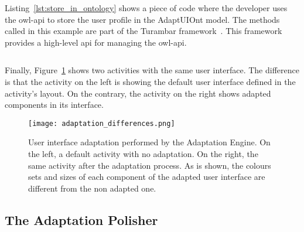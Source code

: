 \inputminted[linenos=true, fontsize=\footnotesize, frame=lines]{java}{4_system_architecture/redraw.java}

\inputminted[linenos=true, fontsize=\footnotesize, frame=lines]{java}{4_system_architecture/abstract_activity.java}

Listing~\ref{lst:store_in_ontology} shows a piece of code where the developer
uses the \ac{owl}-\ac{api} to store the user profile in the AdaptUIOnt model. 
The methods called in this example are part of the Turambar framework~\citep{david_ausin_probabilistic_2014}. 
This framework provides a high-level \ac{api} for managing the \ac{owl}-\ac{api}.

\inputminted[linenos=true, fontsize=\footnotesize, frame=lines]{java}{4_system_architecture/store_in_ontology.java}


Finally, Figure~\ref{fig:adaptation_differences} shows two activities with the
same user interface. The difference is that the activity on the left is showing
the default user interface defined in the activity's layout. On the contrary,
the activity on the right shows adapted components in its interface.

\begin{figure}[H]
\centering
\texttt{[image: adaptation\_differences.png]}
\caption{User interface adaptation performed by the Adaptation Engine. On the
left, a default activity with no adaptation. On the right, the same activity
after the adaptation process. As is shown, the colours sets and sizes of each
component of the adapted user interface are different from the non adapted one.}
\label{fig:adaptation_differences}
\end{figure}


\subsection{The Adaptation Polisher}
\label{sec:adaptation_polisher}


